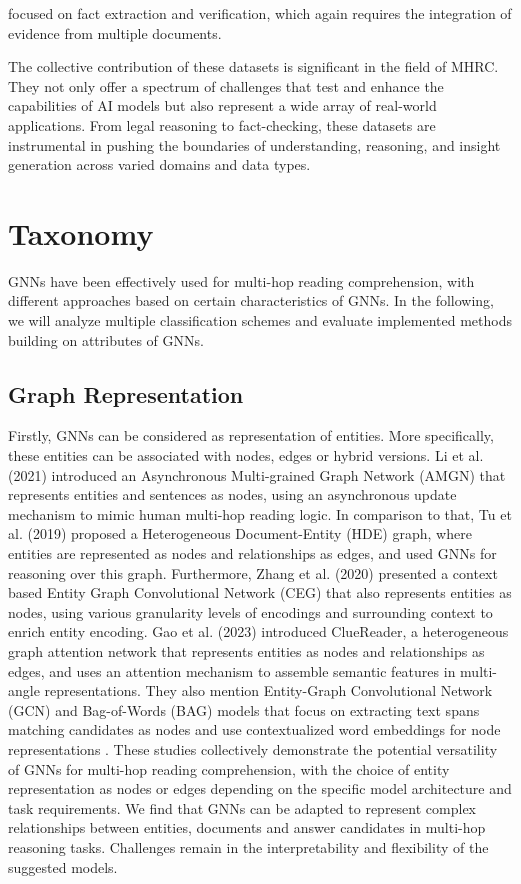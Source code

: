 \documentclass[sigplan,screen,nonacm]{acmart}
\begin{document}
focused on fact extraction and verification, which again requires the integration of evidence from multiple documents.

The collective contribution of these datasets is significant in the field of MHRC. They not only offer a spectrum of challenges that test and enhance the capabilities of AI models but also represent a wide array of real-world applications. From legal reasoning to fact-checking, 
these datasets are instrumental in pushing the boundaries of understanding, reasoning, and insight generation across varied domains and data types.


  
  
\section{Taxonomy}
GNNs have been effectively used for multi-hop reading comprehension, with different approaches based on certain characteristics of GNNs. In
the following, we will analyze multiple classification schemes and evaluate implemented methods building on attributes of GNNs. 

\subsection{Graph Representation}
Firstly, GNNs can be considered as representation of entities. More specifically, these entities can be associated with nodes, edges or hybrid versions. 
Li et al. (2021) \cite{RN131} introduced an Asynchronous Multi-grained Graph Network (AMGN) that represents entities and sentences as nodes, using an asynchronous 
update mechanism to mimic human multi-hop reading logic. In comparison to that, Tu et al. (2019) \cite{RN124} proposed a Heterogeneous Document-Entity (HDE) 
graph, where entities are represented as nodes and relationships as edges, and used GNNs for reasoning over this graph. Furthermore, Zhang et al. (2020) \cite{RN170} presented 
a context based Entity Graph Convolutional Network (CEG) that also represents entities as nodes, using various granularity levels of encodings and surrounding context to enrich entity encoding. Gao et al. (2023) \cite{RN136} introduced ClueReader, a heterogeneous graph attention network that represents entities as nodes and
relationships as edges, and uses an attention mechanism to assemble semantic features in multi-angle representations. They also mention Entity-Graph 
Convolutional Network (GCN) and Bag-of-Words (BAG) models that focus on extracting text spans matching candidates as nodes and use contextualized word embeddings
for node representations \cite{RN136}. These studies collectively demonstrate the potential versatility of GNNs for multi-hop reading comprehension, with the
choice of entity representation as nodes or edges depending on the specific model architecture and task requirements. We find that GNNs can be adapted
to represent complex relationships between entities, documents and answer candidates in multi-hop reasoning tasks. Challenges remain in the 
interpretability and flexibility of the suggested models.
\end{document}
